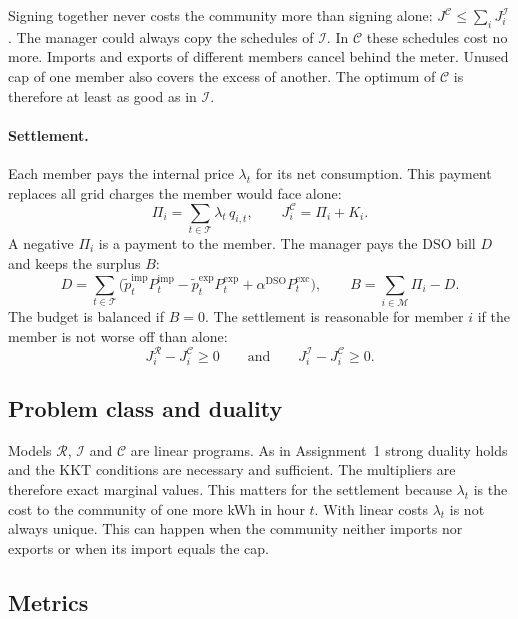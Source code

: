 Signing together never costs the community more than signing alone: $J^{\mathcal{C}}\le\sum_i J^{\mathcal{I}}_i$.
The manager could always copy the schedules of $\mathcal{I}$. In $\mathcal{C}$ these schedules cost no more. Imports and exports of different members cancel behind the meter. Unused cap of one member also covers the excess of another. The optimum of $\mathcal{C}$ is therefore at least as good as in $\mathcal{I}$.

\paragraph{Settlement.}
Each member pays the internal price $\lambda_t$ for its net consumption.
This payment replaces all grid charges the member would face alone:
\begin{equation}\label{eq:payment}
\Pi_i=\sum_{t\in\mathcal{T}}\lambda_t\,q_{i,t},\qquad J^{\mathcal{C}}_i=\Pi_i+K_i.
\end{equation}
A negative $\Pi_i$ is a payment to the member.
The manager pays the DSO bill $D$ and keeps the surplus $B$:
\begin{equation}\label{eq:bill}
D=\sum_{t\in\mathcal{T}}\Big(\tilde{p}^{\mathrm{imp}}_t P^{\mathrm{imp}}_t-\tilde{p}^{\mathrm{exp}}_t P^{\mathrm{exp}}_t+\alpha^{\mathrm{DSO}}P^{\mathrm{exc}}_t\Big),\qquad B=\sum_{i\in\mathcal{M}}\Pi_i-D.
\end{equation}
The budget is balanced if $B=0$. The settlement is reasonable for member $i$ if the member is not worse off than alone:
\begin{equation}\label{eq:ir}
J^{\mathcal{R}}_i-J^{\mathcal{C}}_i\ge 0 \qquad\text{and}\qquad J^{\mathcal{I}}_i-J^{\mathcal{C}}_i\ge 0 .
\end{equation}


\subsection{Problem class and duality }
Models $\mathcal{R}$, $\mathcal{I}$ and $\mathcal{C}$ are linear programs.
As in Assignment~1 strong duality holds and the KKT conditions are necessary and sufficient.
The multipliers are therefore exact marginal values.
This matters for the settlement because $\lambda_t$ is the cost to the community of one more kWh in hour $t$.
With linear costs $\lambda_t$ is not always unique.
This can happen when the community neither imports nor exports or when its import equals the cap.
\subsection{Metrics}

